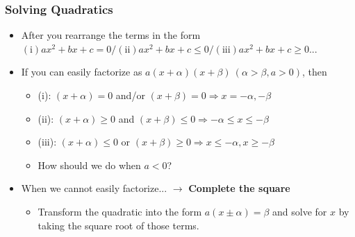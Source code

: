 \documentclass[pdflatex, 12pt]{beamer}
\begin{document}
\begin{frame}
\frametitle{Solving Quadratics}
\begin{itemize}
\item After you rearrange the terms in the form $\mathrm{(i)} ax^2 + bx + c = 0 /\mathrm{(ii)} ax^2 + bx + c \leq 0 /\mathrm{(iii)} ax^2 + bx + c \geq 0$...
\vspace{0.4cm}
\item If you can easily factorize as $a(x + \alpha)(x + \beta)\ (\alpha > \beta, a > 0)$, then
 \begin{itemize}
 \item (i): $(x + \alpha) = 0$ and/or $(x + \beta) = 0 \Rightarrow x = -\alpha, -\beta$
 \item (ii): $(x + \alpha) \geq 0$ and  $(x + \beta) \leq 0 \Rightarrow -\alpha \leq x \leq -\beta$
 \item (iii): $(x + \alpha) \leq 0$ or $(x + \beta) \geq 0 \Rightarrow x \leq -\alpha, x \geq -\beta$
 \item How should we do when $a < 0$?
 \end{itemize}
\vspace{0.4cm}
\item When we cannot easily factorize... $\rightarrow$ \textbf{Complete the square}
 \begin{itemize}
 \item Transform the quadratic into the form $a(x \pm \alpha) = \beta$ and solve for $x$ by taking the square root of those terms.
 \end{itemize}
\end{itemize}
\end{frame}
\end{document}
